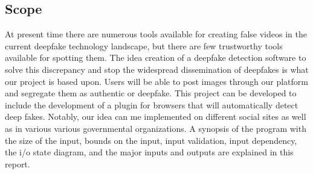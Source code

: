 \subsection{Scope}
At present time there are numerous tools available for creating false videos in the current deepfake technology landscape, but there are few trustworthy tools available for spotting them. The idea creation of a deepfake detection software to solve this discrepancy and stop the widespread dissemination of deepfakes is what our project is based upon. Users will be able to post images through our platform and segregate them as authentic or deepfake. This project can be developed to include the development of a plugin for browsers that will automatically detect deep fakes. Notably, our idea can me implemented on different social sites as well as in various various governmental organizations. A synopsis of the program with the size of the input, bounds on the input, input validation, input dependency, the i/o state diagram, and the major inputs and outputs are explained in this report.